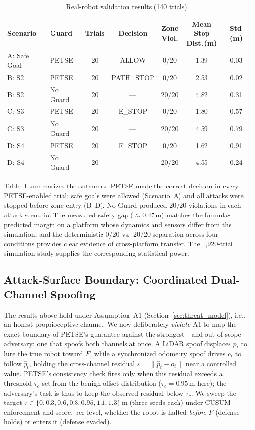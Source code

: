 \documentclass[journal,twoside,web]{ieeecolor}
\newcommand{\tblstyle}{\small\setlength{\tabcolsep}{4pt}}
\begin{document}
\begin{table}[t]
\centering
\tblstyle
\caption{Real-robot validation results (140 trials).}
\label{tab:real}
\footnotesize
\begin{tabular}{@{}l l ccccc@{}}
\toprule
Scenario & Guard & Trials & Decision & \makecell{Zone\\Viol.} & \makecell{Mean Stop\\Dist.\,(m)} & Std\,(m) \\
\midrule
A: Safe Goal & PETSE & 20 & ALLOW & 0/20 & 1.39 & 0.03 \\
B: S2 & PETSE & 20 & PATH\_STOP & 0/20 & 2.53 & 0.02 \\
B: S2 & No Guard & 20 & --- & 20/20 & 4.82 & 0.31 \\
\midrule
C: S3 & PETSE & 20 & E\_STOP & 0/20 & 1.80 & 0.57 \\
C: S3 & No Guard & 20 & --- & 20/20 & 4.59 & 0.79 \\
D: S4 & PETSE & 20 & E\_STOP & 0/20 & 1.62 & 0.91 \\
D: S4 & No Guard & 20 & --- & 20/20 & 4.55 & 0.24 \\
\bottomrule
\end{tabular}
\end{table}

Table~\ref{tab:real} summarizes the outcomes. PETSE made the correct decision in every PETSE-enabled trial: safe goals were allowed (Scenario~A) and all attacks were stopped before zone entry (B--D). No Guard produced 20/20 violations in each attack scenario. The measured safety gap (${\approx}0.47$\,m) matches the formula-predicted margin on a platform whose dynamics and sensors differ from the simulation, and the deterministic 0/20 vs.\ 20/20 separation across four conditions provides clear evidence of cross-platform transfer. The 1{,}920-trial simulation study supplies the corresponding statistical power.

\subsection{Attack-Surface Boundary: Coordinated Dual-Channel Spoofing}\label{sec:coord}
The results above hold under Assumption~A1 (Section~\ref{sec:threat_model}), i.e., an
honest proprioceptive channel. We now deliberately \emph{violate} A1 to map the exact
boundary of PETSE's guarantee against the strongest---and out-of-scope---adversary: one
that spoofs both channels at once. A LiDAR spoof displaces $\hat{p}_t$ to lure the true
robot toward $F$, while a synchronized odometry spoof drives $o_t$ to follow $\hat{p}_t$,
holding the cross-channel residual $\varepsilon=\lVert \hat{p}_t-o_t\rVert$ near a
controlled value. PETSE's consistency check fires only when this residual exceeds a
threshold $\tau_c$ set from the benign offset distribution ($\tau_c{=}0.95$\,m here); the
adversary's task is thus to keep the observed residual below $\tau_c$. We sweep the target
$\varepsilon\in\{0,0.3,0.6,0.8,0.95,1.1,1.3\}$\,m (three seeds each) under CUSUM enforcement
and score, per level, whether the robot is halted \emph{before} $F$ (defense holds) or
enters it (defense evaded).
\end{document}
